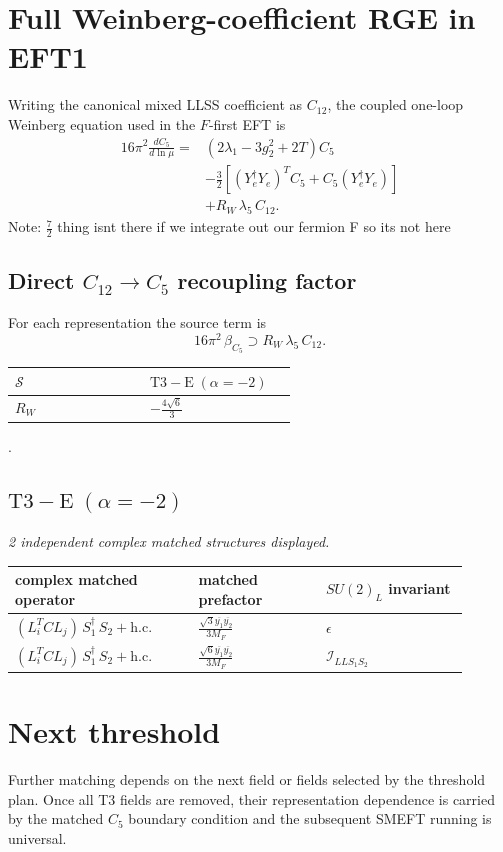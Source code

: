 \documentclass[9pt]{article}
\begin{document}
\section*{Full Weinberg-coefficient RGE in EFT1}
Writing the canonical mixed LLSS coefficient as $C_{12}$, the coupled one-loop Weinberg equation used in the $F$-first EFT is
\begin{align}
16\pi^2\frac{dC_5}{d\ln\mu}={}&(2\lambda_1-3g_2^2+2T)C_5\\
&-\frac32\left[(Y_e^\dagger Y_e)^T C_5+C_5(Y_e^\dagger Y_e)\right]\\
&+R_W\,\lambda_5\,C_{12}.
\end{align}
Note: $\frac{7}{2}$ thing isnt there if we integrate out our fermion F so its not here \subsection*{Direct $C_{12}\to C_5$ recoupling factor}
For each representation the source term is
\[16\pi^2\,\beta_{C_5}\supset R_W\,\lambda_5\,C_{12}.\]
\begin{longtable}{@{}p{0.37\linewidth}p{0.19\linewidth}@{}}
\toprule
$\mathcal{S}$ & $ \mathrm{T3-E}\;(\alpha=-2) $ \\
\midrule
$R_W$ & $ - \frac{4 \sqrt{6}}{3} $ \\
\bottomrule
\end{longtable}
.
\subsection*{$ \mathrm{T3-E}\;(\alpha=-2) $}
\textit{2 independent complex matched structures displayed. }
\begin{longtable}{@{}p{0.36\linewidth}p{0.25\linewidth}p{0.29\linewidth}@{}}
\toprule
complex matched operator & matched prefactor & $SU(2)_L$ invariant \\
\midrule
$ (L_i^T C L_j)\,S_1^\dagger\,S_2+\mathrm{h.c.} $ & $ \frac{\sqrt{3} \overline{y_{1}} \overline{y_{2}}}{3 M_F} $ & $ \epsilon $ \\
$ (L_i^T C L_j)\,S_1^\dagger\,S_2+\mathrm{h.c.} $ & $ \frac{\sqrt{6} \overline{y_{1}} \overline{y_{2}}}{3 M_F} $ & $ \mathcal{I}_{LLS_1S_2} $ \\
\bottomrule
\end{longtable}
\section*{Next threshold}
Further matching depends on the next field or fields selected by the threshold plan.  Once all T3 fields are removed, their representation dependence is carried by the matched $C_5$ boundary condition and the subsequent SMEFT running is universal.
\end{document}
